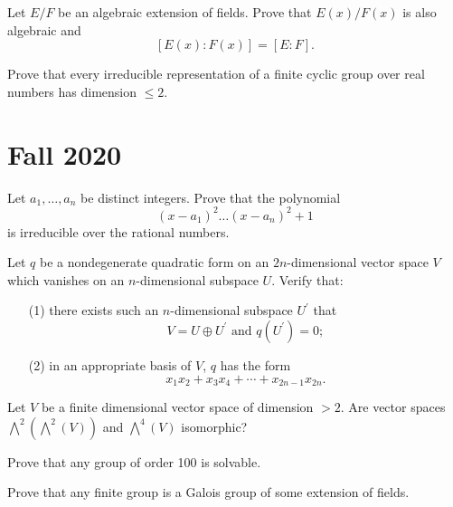 \documentclass[openany]{book}
\begin{document}
\begin{prob}
    Let \(E/F\) be an algebraic extension of fields. Prove that \(E(x)/F(x)\) is also algebraic and 
    \[[E(x):F(x)] = [E:F].\]
\end{prob}


\begin{prob}
    Prove that every irreducible representation of a finite cyclic group over real numbers has dimension \(\leq 2\).
\end{prob}



\chapter{Fall 2020}

\begin{prob}
    Let \(a_{1},\ldots,a_{n}\) be distinct integers. Prove that the polynomial
    \[(x-a_{1})^{2}\ldots(x-a_{n})^{2}+1\]
    is irreducible over the rational numbers.
\end{prob}


\begin{prob}
    Let \(q\) be a nondegenerate quadratic form on an \(2n\)-dimensional vector space \(V\) which vanishes on an \(n\)-dimensional subspace \(U\). Verify that:
    \begin{itemize}
        \item[(1)] there exists such an \(n\)-dimensional subspace \(U^{\prime}\) that \[V=U\oplus U^{\prime}\text{ and }q(U^{\prime})=0;\]
        \item[(2)] in an appropriate basis of \(V\), \(q\) has the form \[x_{1}x_{2}+x_{3}x_{4}+\cdots+x_{2n-1}x_{2n}.\]
    \end{itemize}
\end{prob}


\begin{prob}
    Let \(V\) be a finite dimensional vector space of dimension \(>2\). Are vector spaces \(\bigwedge^{2}(\bigwedge^{2}(V))\) and \(\bigwedge^{4}(V)\) isomorphic?
\end{prob}


\begin{prob}
    Prove that any group of order 100 is solvable.
\end{prob}


\begin{prob}
    Prove that any finite group is a Galois group of some extension of fields.
\end{prob}
\end{document}

